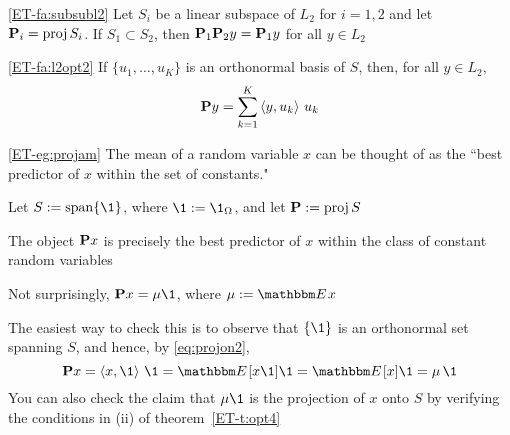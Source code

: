 \begin{frame}

    \vspace{2em}
    \Fact\eqref{ET-fa:subsubl2}
    Let $S_i$ be a linear subspace of $L_2$ for $i=1,2$ and let $\mathbf P_i =
    \operatorname{proj} S_i$.  If $S_1 \subset S_2$, then
        $\mathbf P_1 \mathbf P_2 y = \mathbf P_1 y$ for all $y \in L_2$
        
    \vspace{1em}
    \Fact\eqref{ET-fa:l2opt2}
    If $\{u_1, \ldots, u_K\}$ is an orthonormal basis of $S$, then, for all $y
    \in L_2$,
    \begin{equation}
        \label{eq:projon2}
        \mathbf P y = \sum_{k=1}^K \left\langle{y, u_k}\right\rangle \, u_k
    \end{equation}
    
\end{frame}

\begin{frame}

    \vspace{2em}
    \begin{example}\eqref{ET-eg:projam}
    The mean of a random variable $x$ can be thought of as the 
    ``best predictor of $x$ within the set of constants."  
    
    Let $S := \Span\{\1\}$, where $\1 := \1_\Omega$,
    and let $\mathbf P := \operatorname{proj} S$
    
    The object $\mathbf P x$ is precisely the best predictor
    of $x$ within the class of constant random variables
    
    Not surprisingly, $\boldP x = \mu \1$, where $\mu := \EE x$
    
    The easiest way to check this is to observe that $\{\1\}$ is an
    orthonormal set spanning $S$, and hence, by \eqref{eq:projon2},
    \begin{equation*}
        \boldP x 
        = \inner{x, \1} \, \1
        = \EE[x \1] \1 = \EE[x] \1 = \mu \, \1
    \end{equation*}
    You can also check the claim that $\mu \1$ is the projection of $x$ onto
    $S$ by verifying the conditions in (ii) of theorem~\ref{ET-t:opt4}
    \end{example}

\end{frame}

